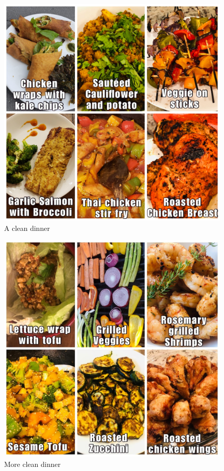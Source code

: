 \documentclass[oneside]{book}
\begin{document}
\begin{figure}
\centering
\includegraphics{pictures/dinner1.JPG}
\caption{A clean dinner}
\end{figure}

\begin{figure}
\centering
\includegraphics{pictures/dinner2.JPG}
\caption{More clean dinner}
\end{figure}
\end{document}
